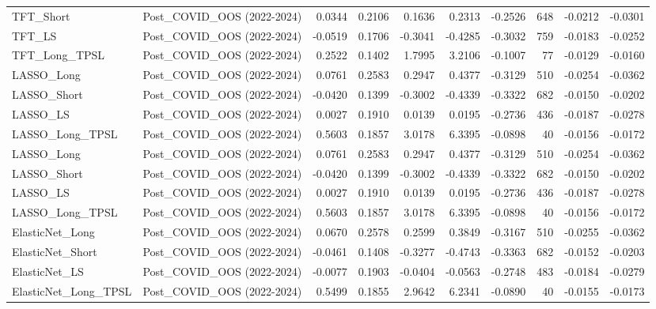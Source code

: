 \begin{tabular}{llrrrrrrrr}
\cline{1-10}
TFT\_Short & Post\_COVID\_OOS (2022-2024) & 0.0344 & 0.2106 & 0.1636 & 0.2313 & -0.2526 & 648 & -0.0212 & -0.0301 \\
\cline{1-10}
TFT\_LS & Post\_COVID\_OOS (2022-2024) & -0.0519 & 0.1706 & -0.3041 & -0.4285 & -0.3032 & 759 & -0.0183 & -0.0252 \\
\cline{1-10}
TFT\_Long\_TPSL & Post\_COVID\_OOS (2022-2024) & 0.2522 & 0.1402 & 1.7995 & 3.2106 & -0.1007 & 77 & -0.0129 & -0.0160 \\
\cline{1-10}
LASSO\_Long & Post\_COVID\_OOS (2022-2024) & 0.0761 & 0.2583 & 0.2947 & 0.4377 & -0.3129 & 510 & -0.0254 & -0.0362 \\
\cline{1-10}
LASSO\_Short & Post\_COVID\_OOS (2022-2024) & -0.0420 & 0.1399 & -0.3002 & -0.4339 & -0.3322 & 682 & -0.0150 & -0.0202 \\
\cline{1-10}
LASSO\_LS & Post\_COVID\_OOS (2022-2024) & 0.0027 & 0.1910 & 0.0139 & 0.0195 & -0.2736 & 436 & -0.0187 & -0.0278 \\
\cline{1-10}
LASSO\_Long\_TPSL & Post\_COVID\_OOS (2022-2024) & 0.5603 & 0.1857 & 3.0178 & 6.3395 & -0.0898 & 40 & -0.0156 & -0.0172 \\
\cline{1-10}
LASSO\_Long & Post\_COVID\_OOS (2022-2024) & 0.0761 & 0.2583 & 0.2947 & 0.4377 & -0.3129 & 510 & -0.0254 & -0.0362 \\
\cline{1-10}
LASSO\_Short & Post\_COVID\_OOS (2022-2024) & -0.0420 & 0.1399 & -0.3002 & -0.4339 & -0.3322 & 682 & -0.0150 & -0.0202 \\
\cline{1-10}
LASSO\_LS & Post\_COVID\_OOS (2022-2024) & 0.0027 & 0.1910 & 0.0139 & 0.0195 & -0.2736 & 436 & -0.0187 & -0.0278 \\
\cline{1-10}
LASSO\_Long\_TPSL & Post\_COVID\_OOS (2022-2024) & 0.5603 & 0.1857 & 3.0178 & 6.3395 & -0.0898 & 40 & -0.0156 & -0.0172 \\
\cline{1-10}
ElasticNet\_Long & Post\_COVID\_OOS (2022-2024) & 0.0670 & 0.2578 & 0.2599 & 0.3849 & -0.3167 & 510 & -0.0255 & -0.0362 \\
\cline{1-10}
ElasticNet\_Short & Post\_COVID\_OOS (2022-2024) & -0.0461 & 0.1408 & -0.3277 & -0.4743 & -0.3363 & 682 & -0.0152 & -0.0203 \\
\cline{1-10}
ElasticNet\_LS & Post\_COVID\_OOS (2022-2024) & -0.0077 & 0.1903 & -0.0404 & -0.0563 & -0.2748 & 483 & -0.0184 & -0.0279 \\
\cline{1-10}
ElasticNet\_Long\_TPSL & Post\_COVID\_OOS (2022-2024) & 0.5499 & 0.1855 & 2.9642 & 6.2341 & -0.0890 & 40 & -0.0155 & -0.0173 \\

\end{tabular}
